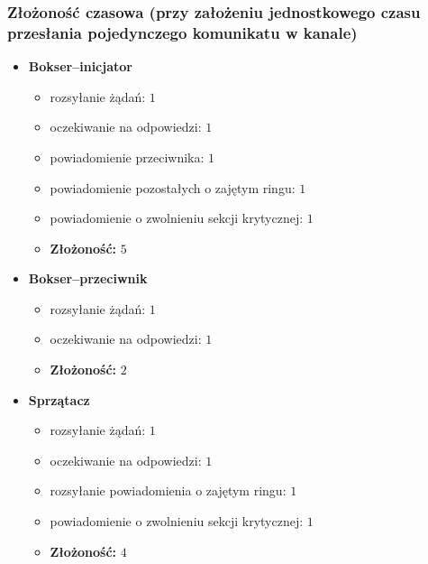 \documentclass{article}
\begin{document}
\subsubsection{Złożoność czasowa (przy założeniu jednostkowego czasu przesłania pojedynczego komunikatu w kanale)}
\begin{itemize}
\item \textbf{Bokser--inicjator}
  \begin{itemize}
  \item rozsyłanie żądań: $1$
  \item oczekiwanie na odpowiedzi: $1$
  \item powiadomienie przeciwnika: $1$
  \item powiadomienie pozostałych o zajętym ringu: $1$
  \item powiadomienie o zwolnieniu sekcji krytycznej: $1$
  \item \textbf{Złożoność:} $5$
  \end{itemize}
\item \textbf{Bokser--przeciwnik}
  \begin{itemize}
  \item rozsyłanie żądań: $1$
  \item oczekiwanie na odpowiedzi: $1$
  \item \textbf{Złożoność:} $2$
  \end{itemize}
\item \textbf{Sprzątacz}
  \begin{itemize}
  \item rozsyłanie żądań: $1$
  \item oczekiwanie na odpowiedzi: $1$
  \item rozsyłanie powiadomienia o zajętym ringu: $1$
  \item powiadomienie o zwolnieniu sekcji krytycznej: $1$
  \item \textbf{Złożoność:} $4$
  \end{itemize}
\end{itemize}

\end{document}
